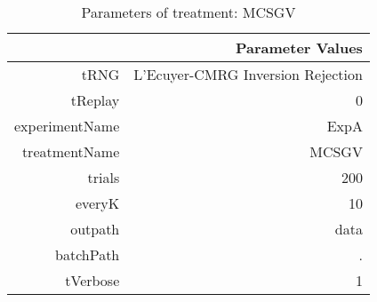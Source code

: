 \begin{table}[ht]
\centering
\begin{tabular}{rr}
  \hline
 & Parameter Values \\ 
  \hline
tRNG & L'Ecuyer-CMRG Inversion Rejection \\ 
  tReplay & 0 \\ 
  experimentName & ExpA \\ 
  treatmentName & MCSGV \\ 
  trials & 200 \\ 
  everyK & 10 \\ 
  outpath & data \\ 
  batchPath & . \\ 
  tVerbose & 1 \\ 
   \hline
\end{tabular}
\caption{ Parameters of treatment: MCSGV 
} 
\end{table}
